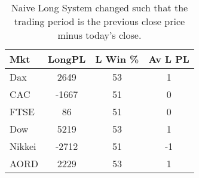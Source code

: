 \begin{table}[ht]
\centering
\caption[Results from the Naive Long System trading close to close]{Naive Long System changed such that the trading period is the previous close price minus today's close.} 
\label{tab:nlng_results_2}
\begin{tabular}{lccc}
  \toprule Mkt & LongPL & L Win \% & Av L PL \\ 
  \midrule Dax & 2649 & 53 & 1 \\ 
  CAC & -1667 & 51 & 0 \\ 
  FTSE & 86 & 51 & 0 \\ 
  Dow & 5219 & 53 & 1 \\ 
  Nikkei & -2712 & 51 & -1 \\ 
  AORD & 2229 & 53 & 1 \\ 
   \bottomrule \end{tabular}
\end{table}
